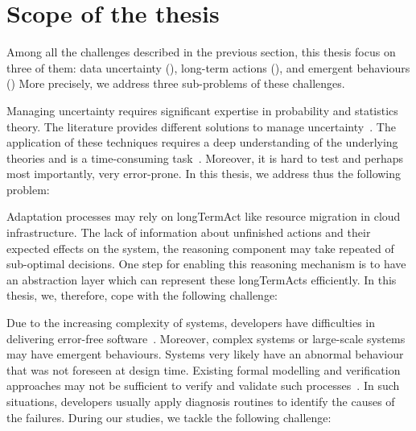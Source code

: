 \section{Scope of the thesis}

Among all the challenges described in the previous section, this thesis focus on three of them: data uncertainty (), long-term actions (), and emergent behaviours ()
More precisely, we address three sub-problems of these challenges.

Managing uncertainty requires significant expertise in probability and statistics theory.
The literature provides different solutions to manage uncertainty~\cite{zadeh1996fuzzy,metrology2008evaluation,shafer1992dempster}.
The application of these techniques requires a deep understanding of the underlying theories and is a time-consuming task~\cite{DBLP:conf/quatic/VallecilloMO16}.
Moreover, it is hard to test and perhaps most importantly, very error-prone.
In this thesis, we address thus the following problem:
\vspace{-2em}

Adaptation processes may rely on \gls{longTermAct} like resource migration in cloud infrastructure.
The lack of information about unfinished actions and their expected effects on the system, the reasoning component may take repeated of sub-optimal decisions.
One step for enabling this reasoning mechanism is to have an abstraction layer which can represent these \glspl{longTermAct} efficiently.
In this thesis, we, therefore, cope with the following challenge:
\vspace{-2em}

Due to the increasing complexity of systems, developers have difficulties in delivering error-free software~\cite{DBLP:conf/icse/BarbosaLMJ17, DBLP:conf/icse/MongielloPS15, DBLP:conf/icse/HassanBB15}.
Moreover, complex systems or large-scale systems may have emergent behaviours.
Systems very likely have an abnormal behaviour that was not foreseen at design time.
Existing formal modelling and verification approaches may not be sufficient to verify and validate such processes~\cite{DBLP:conf/icse/TaharaOH17}.
In such situations, developers usually apply diagnosis routines to identify the causes of the failures.
During our studies, we tackle the following challenge:
\vspace{-2em}

